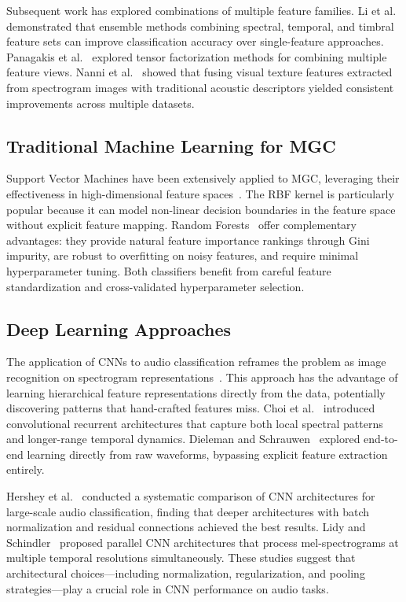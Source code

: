 \documentclass[10pt,journal]{IEEEtran}
\begin{document}
Subsequent work has explored combinations of multiple feature families. Li et al.~\cite{li2003automatic} demonstrated that ensemble methods combining spectral, temporal, and timbral feature sets can improve classification accuracy over single-feature approaches. Panagakis et al.~\cite{panagakis2009music} explored tensor factorization methods for combining multiple feature views. Nanni et al.~\cite{nanni2016combining} showed that fusing visual texture features extracted from spectrogram images with traditional acoustic descriptors yielded consistent improvements across multiple datasets.

\subsection{Traditional Machine Learning for MGC}

Support Vector Machines have been extensively applied to MGC, leveraging their effectiveness in high-dimensional feature spaces~\cite{cortes1995support}. The RBF kernel is particularly popular because it can model non-linear decision boundaries in the feature space without explicit feature mapping. Random Forests~\cite{breiman2001random} offer complementary advantages: they provide natural feature importance rankings through Gini impurity, are robust to overfitting on noisy features, and require minimal hyperparameter tuning. Both classifiers benefit from careful feature standardization and cross-validated hyperparameter selection.

\subsection{Deep Learning Approaches}

The application of CNNs to audio classification reframes the problem as image recognition on spectrogram representations~\cite{costa2017evaluation}. This approach has the advantage of learning hierarchical feature representations directly from the data, potentially discovering patterns that hand-crafted features miss. Choi et al.~\cite{choi2017convolutional} introduced convolutional recurrent architectures that capture both local spectral patterns and longer-range temporal dynamics. Dieleman and Schrauwen~\cite{dieleman2014end} explored end-to-end learning directly from raw waveforms, bypassing explicit feature extraction entirely.

Hershey et al.~\cite{hershey2017cnn} conducted a systematic comparison of CNN architectures for large-scale audio classification, finding that deeper architectures with batch normalization and residual connections achieved the best results. Lidy and Schindler~\cite{lidy2016parallel} proposed parallel CNN architectures that process mel-spectrograms at multiple temporal resolutions simultaneously. These studies suggest that architectural choices---including normalization, regularization, and pooling strategies---play a crucial role in CNN performance on audio tasks.
\end{document}
